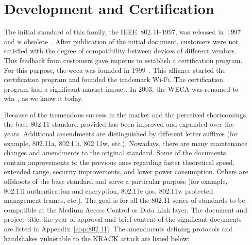 \section{Development and Certification}
   
The initial standard of this family, the IEEE~802.11-1997, was released in~1997 and is obsolete~\cite{GA05}. After publication of the initial document, customers were not satisfied with the degree of compatibility between devices of different vendors. This feedback from customers gave impetus to establish a certification program. For this purpose, the \gls{weca} was founded in 1999~\cite{HI10}. This alliance started the certification program and founded the trademark Wi-Fi. The certification program had a significant market impact. In 2003, the WECA was renamed to \gls{wfa}~\cite{HI10}, as we know it today. 

Because of the tremendous success in the market and the perceived shortcomings, the base 802.11 standard provided has been improved and expanded over the years. Additional amendments are distinguished by different letter suffixes (for example, 802.11a, 802.11i, 802.11w, etc.). Nowadays, there are many maintenance changes and amendments to the original standard. Some of the documents contain improvements to the previous ones regarding faster theoretical speed, extended range, security improvements, and lower power consumption. Others are offshoots of the base standard and serve a particular purpose (for example, 802.11i authentication and encryption, 802.11e \gls{qos}, 802.11w protected management frames, etc.). The goal is for all the 802.11 series of standards to be compatible at the Medium Access Control or Data Link layer. The document and project title, the year of approval and brief content of the significant documents are listed in Appendix~\ref{app:802.11}. The amendments defining protocols and handshakes vulnerable to the KRACK attack are listed below:


